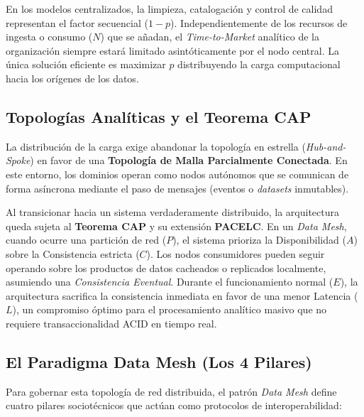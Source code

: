 \documentclass[12pt, a4paper]{article}
\begin{document}
En los modelos centralizados, la limpieza, catalogación y control de calidad representan el factor secuencial ($1 - p$). Independientemente de los recursos de ingesta o consumo ($N$) que se añadan, el \textit{Time-to-Market} analítico de la organización siempre estará limitado asintóticamente por el nodo central. La única solución eficiente es maximizar $p$ distribuyendo la carga computacional hacia los orígenes de los datos.

\subsection{Topologías Analíticas y el Teorema CAP}

La distribución de la carga exige abandonar la topología en estrella (\textit{Hub-and-Spoke}) en favor de una \textbf{Topología de Malla Parcialmente Conectada}. En este entorno, los dominios operan como nodos autónomos que se comunican de forma asíncrona mediante el paso de mensajes (eventos o \textit{datasets} inmutables).

Al transicionar hacia un sistema verdaderamente distribuido, la arquitectura queda sujeta al \textbf{Teorema CAP} y su extensión \textbf{PACELC}. En un \textit{Data Mesh}, cuando ocurre una partición de red ($P$), el sistema prioriza la Disponibilidad ($A$) sobre la Consistencia estricta ($C$). Los nodos consumidores pueden seguir operando sobre los productos de datos cacheados o replicados localmente, asumiendo una \textit{Consistencia Eventual}. Durante el funcionamiento normal ($E$), la arquitectura sacrifica la consistencia inmediata en favor de una menor Latencia ($L$), un compromiso óptimo para el procesamiento analítico masivo que no requiere transaccionalidad ACID en tiempo real.

\subsection{El Paradigma Data Mesh (Los 4 Pilares)}

Para gobernar esta topología de red distribuida, el patrón \textit{Data Mesh} define cuatro pilares sociotécnicos que actúan como protocolos de interoperabilidad:
\end{document}
